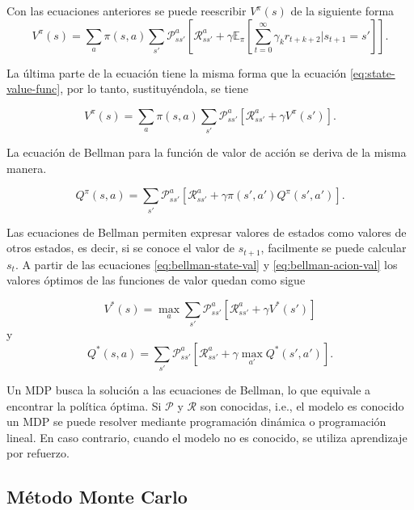Con las ecuaciones anteriores se puede reescribir $V^\pi(s)$ de la
siguiente forma
\[
V^\pi(s) = \sum_a \pi(s,a) \sum_{s'}\mathcal{P}_{ss'}^a [\mathcal{R}_{ss'}^a +
\gamma \mathbb{E}_\pi[\sum_{t = 0}^\infty \gamma_{k} r_{t+k+2} | s_{t+1} = s']].
\]

La última parte de la ecuación tiene
la misma forma que la ecuación \ref{eq:state-value-func}, por lo tanto, sustituyéndola, se tiene

\begin{equation}\label{eq:bellman-state-val}
    V^\pi(s) = \sum_a \pi(s,a) \sum_{s'}\mathcal{P}_{ss'}^a [\mathcal{R}_{ss'}^a + \gamma V^\pi(s')].
\end{equation}

La ecuación de Bellman para la función de valor de acción se deriva de la misma manera.

\begin{equation}\label{eq:bellman-acion-val}
    Q^\pi(s, a) = \sum_{s'}\mathcal{P}_{ss'}^a [\mathcal{R}_{ss'}^a + \gamma \pi(s',a')Q^\pi(s', a')].
\end{equation}

Las ecuaciones de Bellman permiten expresar valores de estados como
valores de otros estados, es decir, si se conoce el valor de $s_{t+1}$,
facilmente se puede calcular $s_t$. A partir de las ecuaciones \ref{eq:bellman-state-val} y \ref{eq:bellman-acion-val} los valores óptimos de
las funciones de valor quedan como sigue

\[
V^*(s) = \max_{a}\sum_{s'}\mathcal{P}_{ss'}^a[\mathcal{R}_{ss'}^a + \gamma V^*(s')]
\]
y 
\[
Q^*(s,a) = \sum_{s'}\mathcal{P}_{ss'}^a[\mathcal{R}_{ss'}^a + \gamma \max_{a'}Q^*(s',a')].
\]

Un MDP busca la solución a las ecuaciones de Bellman, lo que equivale a encontrar
la política óptima. Si $\mathcal{P}$ y $\mathcal{R}$ son conocidas, i.e., el
modelo es conocido un MDP se puede resolver mediante programación dinámica o
programación lineal. En caso contrario, cuando el modelo no es conocido,
se utiliza aprendizaje por refuerzo.

\subsection{Método Monte Carlo}

